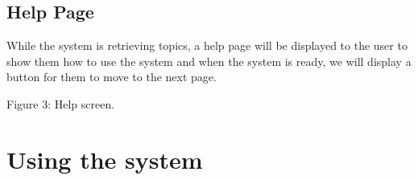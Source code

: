 \documentclass[hidelinks,english]{article}
\begin{document}
    \subsection{Help Page}
        While the system is retrieving topics, a help page will be displayed to the user to show them how to use the system and when the system is ready, we will display a button for them to move to the next page.
    	\begin{center}
    	  \caption{Figure 3: Help screen.}
    	  \label{Select Data}
    	\end{center}
    	
    \section{Using the system}
\end{document}
